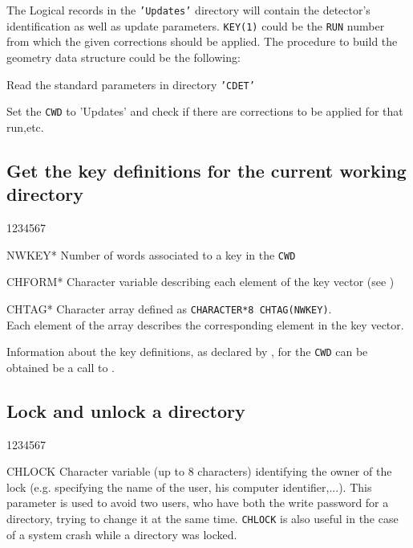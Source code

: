 The Logical records in the {\tt'Updates'} directory will contain the
detector's identification as well as update parameters. {\tt KEY(1)} could be
the {\tt RUN} number from which the given corrections should be applied.
The procedure to build the geometry data structure could be the following:

\begin{UL}
\item Read the standard parameters in directory {\tt'CDET'}
\item Set the {\tt CWD} to 'Updates' and check if there are corrections
to be applied for that run,etc.
\end{UL}

\subsection{Get the key definitions for the current working directory}

\Odesc
\begin{DLtt}{1234567}
\item[NWKEY*]Number of words associated to a key in the {\tt CWD}
\item[CHFORM*]Character variable describing each element of the key vector
(see )
\item[CHTAG*]Character array defined as {\tt CHARACTER*8 CHTAG(NWKEY)}.\\
Each element of the array describes the corresponding
element in the key vector.
\end{DLtt}

Information about the key definitions, as declared by ,
for the {\tt CWD} can be obtained be a call to .


\subsection{Lock and unlock a directory}
\begin{DLtt}{1234567}
\item[CHLOCK]Character variable (up to 8 characters) identifying the owner
of the lock (e.g.
specifying the name of the user, his computer identifier,...).
This parameter is used to avoid two users, who have both the
write password for a directory, trying to change it at the same time.
{\tt CHLOCK} is also useful in the case of a system crash while a directory
was locked.
\end{DLtt}

